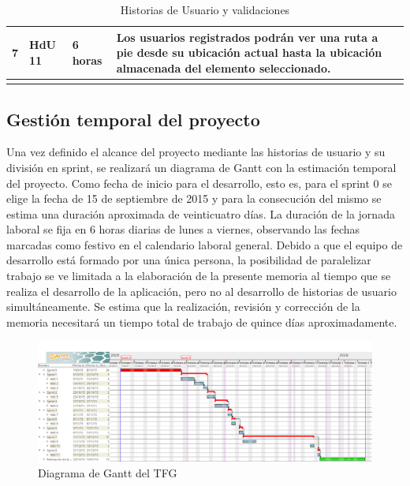 \begin{longtable}{p{1cm} p{4cm} p{4cm} p{6cm}}
	7	& HdU 11	&	6 horas		&	Los usuarios registrados podrán ver una ruta a pie desde su ubicación actual hasta la ubicación 											almacenada del elemento seleccionado. \\

	\hline
	\caption{Historias de Usuario y validaciones}
	\label{tab:validaciones_HdU}
\end{longtable}

	\subsection{Gestión temporal del proyecto}
	Una vez definido el alcance del proyecto mediante las historias de usuario y su división en sprint, se realizará un diagrama de Gantt con la estimación temporal del proyecto.
	Como fecha de inicio para el desarrollo, esto es, para el sprint 0 se elige la fecha de 15 de septiembre de 2015 y para la consecución del mismo se estima una duración aproximada de veinticuatro días. La duración de la jornada laboral se fija en 6 horas diarias de lunes a viernes, observando las fechas marcadas como festivo en el calendario laboral general.
	Debido a que el equipo de desarrollo está formado por una única persona, la posibilidad de paralelizar trabajo se ve limitada a la elaboración de la presente memoria al tiempo que se realiza el desarrollo de la aplicación, pero no al desarrollo de historias de usuario simultáneamente.
	Se estima que la realización, revisión y corrección de la memoria necesitará un tiempo total de trabajo de quince días aproximadamente.

\begin{figure}
	\includegraphics[scale=0.5, fbox={\fboxrule} 4mm]{./images/05-resultados/01-gantt.png}
	\caption{Diagrama de Gantt del \ac{TFG}}
	\label{fig:gantt}
\end{figure}
	
